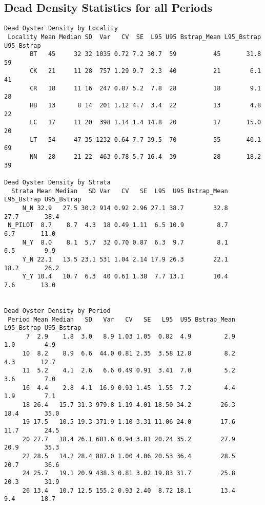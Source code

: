 \documentclass[
]{article}
\begin{document}
\newpage

\hypertarget{dead-density-statistics-for-all-periods}{%
\subsection{Dead Density Statistics for all
Periods}\label{dead-density-statistics-for-all-periods}}

\begin{verbatim}
Dead Oyster Density by Locality
 Locality Mean Median SD  Var   CV  SE  L95 U95 Bstrap_Mean L95_Bstrap U95_Bstrap
       BT   45     32 32 1035 0.72 7.2 30.7  59          45       31.8         59
       CK   21     11 28  757 1.29 9.7  2.3  40          21        6.1         41
       CR   18     11 16  247 0.87 5.2  7.8  28          18        9.1         28
       HB   13      8 14  201 1.12 4.7  3.4  22          13        4.8         22
       LC   17     11 20  398 1.14 1.4 14.8  20          17       15.0         20
       LT   54     47 35 1232 0.64 7.7 39.5  70          55       40.1         69
       NN   28     21 22  463 0.78 5.7 16.4  39          28       18.2         39

Dead Oyster Density by Strata
  Strata Mean Median   SD Var   CV   SE  L95  U95 Bstrap_Mean L95_Bstrap U95_Bstrap
     N_N 32.9   27.5 30.2 914 0.92 2.96 27.1 38.7        32.8       27.7       38.4
 N_PILOT  8.7    8.7  4.3  18 0.49 1.11  6.5 10.9         8.7        6.7       11.0
     N_Y  8.0    8.1  5.7  32 0.70 0.87  6.3  9.7         8.1        6.5        9.9
     Y_N 22.1   13.5 23.1 531 1.04 2.14 17.9 26.3        22.1       18.2       26.2
     Y_Y 10.4   10.7  6.3  40 0.61 1.38  7.7 13.1        10.4        7.6       13.0


Dead Oyster Density by Period
 Period Mean Median   SD   Var   CV   SE   L95  U95 Bstrap_Mean L95_Bstrap U95_Bstrap
      7  2.9    1.8  3.0   8.9 1.03 1.05  0.82  4.9         2.9        1.0        4.9
     10  8.2    8.9  6.6  44.0 0.81 2.35  3.58 12.8         8.2        4.3       12.7
     11  5.2    4.1  2.6   6.6 0.49 0.91  3.41  7.0         5.2        3.6        7.0
     16  4.4    2.8  4.1  16.9 0.93 1.45  1.55  7.2         4.4        1.9        7.1
     18 26.4   15.7 31.3 979.8 1.19 4.01 18.50 34.2        26.3       18.4       35.0
     19 17.5   10.5 19.3 371.9 1.10 3.31 11.06 24.0        17.6       11.7       24.5
     20 27.7   18.4 26.1 681.6 0.94 3.81 20.24 35.2        27.9       20.9       35.3
     22 28.5   14.2 28.4 807.0 1.00 4.06 20.53 36.4        28.5       20.7       36.6
     24 25.7   19.1 20.9 438.3 0.81 3.02 19.83 31.7        25.8       20.3       31.9
     26 13.4   10.7 12.5 155.2 0.93 2.40  8.72 18.1        13.4        9.4       18.7
\end{verbatim}
\end{document}

